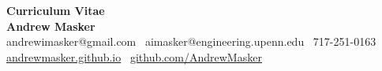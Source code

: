 \begin{center}
    \textbf{Curriculum Vitae}\\
    {\Large \textbf{Andrew Masker}}\\
    \vspace{2pt}
    andrewimasker@gmail.com \textbullet\ aimasker@engineering.upenn.edu \textbullet\ 717-251-0163\\
    \href{https://andrewmasker.github.io}{andrewmasker.github.io} \textbullet\ \href{https://github.com/AndrewMasker}{github.com/AndrewMasker}\\
    \hrulefill
\end{center}
